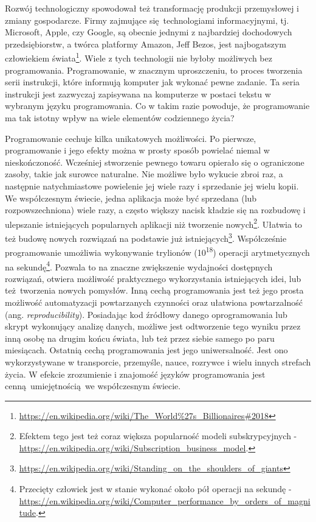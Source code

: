 \documentclass[paper=6in:9in,pagesize=pdftex,headinclude=on,footinclude=on,10pt]{scrbook}
\begin{document}
Rozwój technologiczny spowodował też transformację produkcji przemysłowej i zmiany gospodarcze.
Firmy zajmujące się~technologiami informacyjnymi, tj. Microsoft, Apple, czy Google, są obecnie jednymi z najbardziej dochodowych przedsiębiorstw, a twórca platformy Amazon, Jeff Bezos, jest najbogatszym człowiekiem świata\footnote{\url{https://en.wikipedia.org/wiki/The_World\%27s_Billionaires\#2018}}.
Wiele z tych technologii nie byłoby możliwych bez programowania.
Programowanie, w znacznym uproszczeniu, to proces tworzenia serii instrukcji, które informują komputer jak wykonać pewne zadanie.
Ta seria instrukcji jest zazwyczaj zapisywana na komputerze w postaci tekstu w wybranym języku programowania.
Co w takim razie powoduje, że programowanie ma tak istotny wpływ na wiele elementów codziennego życia?

Programowanie cechuje kilka unikatowych możliwości.
Po pierwsze, programowanie i jego efekty można w prosty sposób powielać niemal w nieskończoność.
Wcześniej stworzenie pewnego towaru opierało się o ograniczone zasoby, takie jak surowce naturalne.
Nie możliwe było wykucie zbroi raz, a następnie natychmiastowe powielenie jej wiele razy i sprzedanie jej wielu kopii.
We współczesnym świecie, jedna aplikacja może być sprzedana (lub rozpowszechniona) wiele razy, a często większy nacisk kładzie się na rozbudowę i ulepszanie istniejących popularnych aplikacji niż tworzenie nowych\footnote{Efektem tego jest też coraz większa popularność modeli subskrypcyjnych - \url{https://en.wikipedia.org/wiki/Subscription_business_model}.}.
Ułatwia to też budowę nowych rozwiązań na podstawie już istniejących\footnote{\url{https://en.wikipedia.org/wiki/Standing_on_the_shoulders_of_giants}}.
Współcześnie programowanie umożliwia wykonywanie trylionów (10\textsuperscript{18}) operacji arytmetycznych na sekundę\footnote{Przecięty człowiek jest w stanie wykonać około pół operacji na sekundę - \url{https://en.wikipedia.org/wiki/Computer_performance_by_orders_of_magnitude}.}.
Pozwala to na znaczne zwiększenie wydajności dostępnych rozwiązań, otwiera możliwość praktycznego wykorzystania istniejących idei, lub też~tworzenia nowych pomysłów.
Inną cechą programowania jest też jego prosta możliwość automatyzacji powtarzanych czynności oraz ułatwiona powtarzalność (ang. \emph{reproducibility}).
Posiadając kod źródłowy danego oprogramowania lub skrypt wykonujący analizę danych, możliwe jest odtworzenie tego wyniku przez inną osobę na drugim końcu świata, lub też przez siebie samego po paru miesiącach.
Ostatnią cechą programowania jest jego uniwersalność.
Jest ono wykorzystywane w transporcie, przemyśle, nauce, rozrywce i wielu innych strefach życia.
W efekcie zrozumienie i znajomość języków programowania jest cenną~umiejętnością~we współczesnym świecie.
\end{document}
